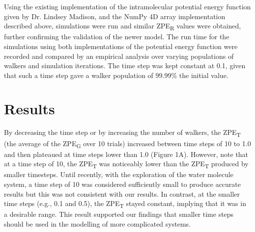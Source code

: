 \documentclass[journal=jacsat,manuscript=article]{achemso}
\begin{document}
Using the existing implementation of the intramolecular potential energy function given by Dr. Lindsey Madison, and the NumPy 4D array implementation described above, simulations were run and similar ZPE\textsubscript{R} values were obtained, further confirming the validation of the newer model. The run time for the simulations using both implementations of the potential energy function were recorded and compared by an empirical analysis over varying populations of walkers and simulation iterations. The time step was kept constant at 0.1, given that such a time step gave a walker population of 99.99\% the initial value.

\section{Results}

By decreasing the time step or by increasing the number of walkers, the ZPE\textsubscript{T} (the average of the ZPE\textsubscript{G} over 10 trials) increased between time steps of 10 to 1.0 and then plateaued at time steps lower than 1.0 (Figure 1A). However, note that at a time step of 10, the ZPE\textsubscript{T} was noticeably lower than the ZPE\textsubscript{T} produced by smaller timesteps. Until recently, with the exploration of the water molecule system, a time step of 10 was considered sufficiently small to produce accurate results but this was not consistent with our results. In contrast, at the smaller time steps (e.g., 0.1 and 0.5), the ZPE\textsubscript{T} stayed constant, implying that it was in a desirable range. This result supported our findings that smaller time steps should be used in the modelling of more complicated systems. 
\end{document}
